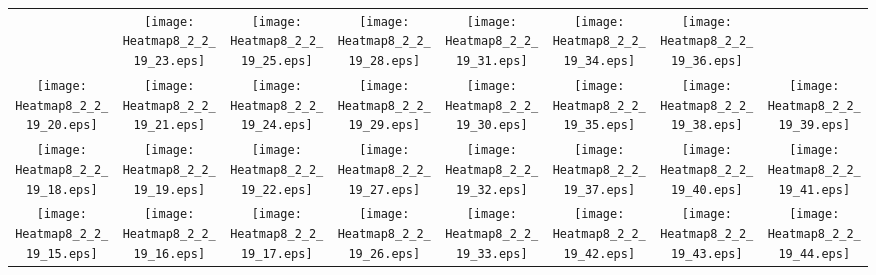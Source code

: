 \documentclass{standalone}
\begin{document}
\renewcommand{\arraystretch}{0}
\setlength{\tabcolsep}{0pt}
\begin{tabular}{ *8{c} }
 & \texttt{[image: Heatmap8\_2\_2\_19\_23.eps]} & \texttt{[image: Heatmap8\_2\_2\_19\_25.eps]} & \texttt{[image: Heatmap8\_2\_2\_19\_28.eps]} & \texttt{[image: Heatmap8\_2\_2\_19\_31.eps]} & \texttt{[image: Heatmap8\_2\_2\_19\_34.eps]} & \texttt{[image: Heatmap8\_2\_2\_19\_36.eps]} &  \\
\texttt{[image: Heatmap8\_2\_2\_19\_20.eps]} & \texttt{[image: Heatmap8\_2\_2\_19\_21.eps]} & \texttt{[image: Heatmap8\_2\_2\_19\_24.eps]} & \texttt{[image: Heatmap8\_2\_2\_19\_29.eps]} & \texttt{[image: Heatmap8\_2\_2\_19\_30.eps]} & \texttt{[image: Heatmap8\_2\_2\_19\_35.eps]} & \texttt{[image: Heatmap8\_2\_2\_19\_38.eps]} & \texttt{[image: Heatmap8\_2\_2\_19\_39.eps]} \\
\texttt{[image: Heatmap8\_2\_2\_19\_18.eps]} & \texttt{[image: Heatmap8\_2\_2\_19\_19.eps]} & \texttt{[image: Heatmap8\_2\_2\_19\_22.eps]} & \texttt{[image: Heatmap8\_2\_2\_19\_27.eps]} & \texttt{[image: Heatmap8\_2\_2\_19\_32.eps]} & \texttt{[image: Heatmap8\_2\_2\_19\_37.eps]} & \texttt{[image: Heatmap8\_2\_2\_19\_40.eps]} & \texttt{[image: Heatmap8\_2\_2\_19\_41.eps]} \\
\texttt{[image: Heatmap8\_2\_2\_19\_15.eps]} & \texttt{[image: Heatmap8\_2\_2\_19\_16.eps]} & \texttt{[image: Heatmap8\_2\_2\_19\_17.eps]} & \texttt{[image: Heatmap8\_2\_2\_19\_26.eps]} & \texttt{[image: Heatmap8\_2\_2\_19\_33.eps]} & \texttt{[image: Heatmap8\_2\_2\_19\_42.eps]} & \texttt{[image: Heatmap8\_2\_2\_19\_43.eps]} & \texttt{[image: Heatmap8\_2\_2\_19\_44.eps]} \\

\end{tabular}
\end{document}
